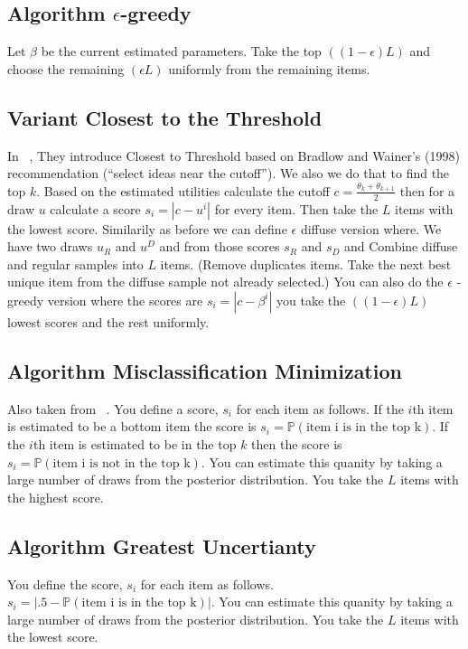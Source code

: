 \documentclass[nonblindrev]{informs3}
\begin{document}
\subsection{Algorithm $\epsilon$-greedy}
Let $\beta$ be the current estimated parameters. Take the top $((1-\epsilon)L)$ and choose the remaining $(\epsilon L)$ uniformly from the remaining items.

\subsection{Variant Closest to the Threshold}
In ~\cite{toubia2007adaptive},  They introduce Closest to Threshold based on Bradlow and Wainer’s (1998) recommendation
(``select ideas near the cutoff''). We also we do that to find the top $k$. Based on the estimated utilities calculate the cutoff $c=\frac{\theta_k+\theta_{k+1}}{2}$ then for a draw $u$ calculate a score $s_i=|c-u^i|$ for every item. Then take the $L$ items with the lowest score. Similarily as before we can define $\epsilon$  diffuse version where. We have two draws $u_R$ and $u^D$ and from those scores $s_R$ and $s_D$ and Combine diffuse and regular samples into $L$ items. (Remove duplicates items. Take the next best unique item from the diffuse sample not already selected.) You can also do the $\epsilon$ - greedy version where the scores are $s_i=|c-\beta^i|$ you take the $((1-\epsilon)L)$ lowest scores and the rest uniformly.

\subsection{Algorithm Misclassification Minimization}
Also taken from ~\cite{toubia2007adaptive}. You define a score, $s_i$ for each item as follows. If the $i$th item is estimated to be a bottom item the score is $s_i=\mathbb{P}(\text{item i is in the top k})$. If the $i$th  item is estimated to be in the top $k$ then the score is $s_i=\mathbb{P}(\text{item i is not in the top k})$. You can estimate this quanity by taking a large number of draws from the posterior distribution. You take the $L$ items with the highest score.

\subsection{Algorithm Greatest Uncertianty}
You define the score, $s_i$ for each item as follows. $s_i=|.5-\mathbb{P}(\text{item i is in the top k})|$. You can estimate this quanity by taking a large number of draws from the posterior distribution. You take the $L$ items with the lowest score.
\end{document}
